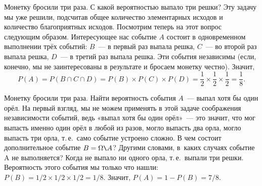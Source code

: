 \documentclass[11pt]{article}
\begin{document}
\begin{example}
	Монетку бросили три раза. С какой вероятностью выпало три решки? Эту задачу мы уже решили, подсчитав общее количество элементарных исходов и количество благоприятных исходов. Посмотрим теперь на этот вопрос следующим образом. Интересующее нас событие $A$ состоит в одновременном выполнении трёх событий: $B$~--- в первый раз выпала решка, $C$~--- во второй раз выпала решка, $D$~--- в третий раз выпала решка. Эти события независимы (если, конечно, мы не заинтересованы в результате и бросаем монетку честно). Значит,
	$$
	P(A)=P(B\cap C\cap D)=P(B)\times P(C)\times P(D)=\frac{1}{2}\times\frac{1}{2}\times\frac{1}{2}=\frac{1}{8}.
	$$
\end{example}

\begin{example}
	Монетку бросили три раза. Найти вероятность события $A$~--- выпал хотя бы один орёл. На первый взгляд, мы не можем применять в этой задаче соображения независимости событий, ведь «выпал хотя бы один орёл»~--- это значит, что мог выпасть именно один орёл в любой из разов, могло выпасть два орла, могло выпасть три орла, т.\,е.~само событие устроено сложно. В чем состоит дополнительное событие $B=\Omega \verb|\| A $? Другими словами, в~каких случаях событие A не выполняется? Когда не выпало ни одного орла, т.\,е.~выпали три решки. Вероятность этого события мы только что нашли: $P(B)=1/2\times1/2\times1/2=1/8$. Значит, $P(A)=1-P(B)=7/8$.
\end{example}
\end{document}
